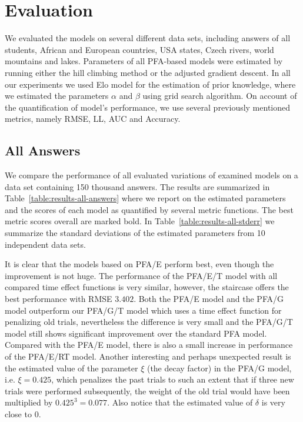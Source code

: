 \section{Evaluation}
\label{evaluation}

We evaluated the models on several different data sets, including answers of all students, African and European countries, USA states, Czech rivers, world mountains and lakes. Parameters of all PFA-based models were estimated by running either the hill climbing method or the adjusted gradient descent. In all our experiments we used Elo model for the estimation of prior knowledge, where we estimated the parameters $\alpha$ and $\beta$ using grid search algorithm. On account of the quantification of model's performance, we use several previously mentioned metrics, namely RMSE, LL, AUC and Accuracy.

\subsection{All Answers}

We compare the performance of all evaluated variations of examined models on a data set containing 150 thousand answers. The results are summarized in Table~\ref{table:results-all-answers} where we report on the estimated parameters and the scores of each model as quantified by several metric functions. The best metric scores overall are marked bold. In Table~\ref{table:results-all-stderr} we summarize the standard deviations of the estimated parameters from 10 independent data sets.

It is clear that the models based on PFA/E perform best, even though the improvement is not huge. The performance of the PFA/E/T model with all compared time effect functions is very similar, however, the staircase offers the best performance with RMSE $3.402$. Both the PFA/E model and the PFA/G model outperform our PFA/G/T model which uses a time effect function for penalizing old trials, nevertheless the difference is very small and the PFA/G/T model still shows significant improvement over the standard PFA model. Compared with the PFA/E model, there is also a small increase in performance of the PFA/E/RT model. Another interesting and perhaps unexpected result is the estimated value of the parameter $\xi$ (the decay factor) in the PFA/G model, i.e. $\xi = 0.425$, which penalizes the past trials to such an extent that if three new trials were performed subsequently, the weight of the old trial would have been multiplied by $0.425^3 = 0.077$. Also notice that the estimated value of $\delta$ is very close to $0$.

